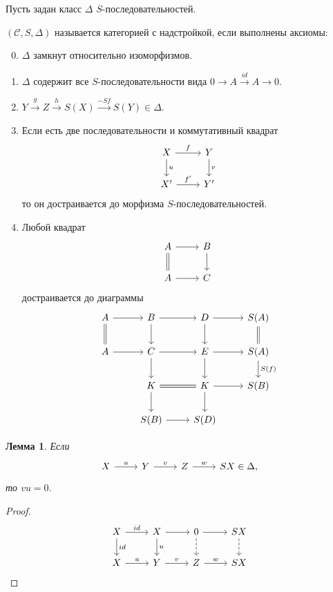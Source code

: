 \documentclass{article}
\newtheorem*{lemma}{Лемма}
\theoremstyle{definition}
\theoremstyle{remark}
\newcommand{\Cat}{\mathcal{C}}
\newenvironment{enum}[2][\parindent]{\begin{enumerate}[nosep, wide, labelindent = #1, label=#2]}{\end{enumerate}}
\newenvironment{cd}{\begin{equation*}\begin{tikzcd}}{\end{tikzcd}\end{equation*}}
\begin{document}
Пусть задан класс $\Delta$ $S$-последовательностей.

$(\Cat, S, \Delta)$ называется категорией с надстройкой, если выполнены аксиомы:
\begin{enum}{Tr \arabic*}
    \setcounter{enumi}{-1}
    \item $\Delta$ замкнут относительно изоморфизмов.
    \item $\Delta$ содержит все $S$-последовательности вида $0 \rightarrow A \xrightarrow{id} A \rightarrow 0$.
    \item $Y \xrightarrow{g} Z \xrightarrow{h} S(X) \xrightarrow{-Sf} S(Y) \in \Delta$.
    \item Если есть две последовательности и коммутативный квадрат
    \begin{cd}
        X \dar["u"] \rar["f"] & Y \dar["v"] \\
        X' \rar["f'"] & Y'
    \end{cd}
    то он достраивается до морфизма $S$-последовательностей.
    \item Любой квадрат 
    \begin{cd}
        A \dar[equal] \rar & B \dar \\
        A \rar & C
    \end{cd}
    достраивается до диаграммы
    \begin{cd}
    A \dar[equal] \rar & B \dar \rar & D \dar \rar & S(A) \dar[equal]\\
    A \rar & C \dar \rar & E \dar \rar & S(A) \dar["S(f)"]\\
    & K \dar \rar[equal] & K \dar \rar & S(B) \\
    & S(B) \rar & S(D)
    \end{cd}
\end{enum}

\begin{lemma}
    Если
    \begin{cd}
        X \rar["u"] & Y \rar["v"] & Z \rar["w"] & SX \in \Delta,
    \end{cd}
    то $vu = 0$.
\end{lemma}

\begin{proof}
    \begin{cd}
    X \rar["id"] \dar["id"] & X \dar["u"] \rar & 0 \dar[dashed] \rar & SX \dar[dashed] \\
    X \rar["u"] & Y \rar["v"] & Z \rar["w"] & SX
    \end{cd}
\end{proof}
\end{document}
